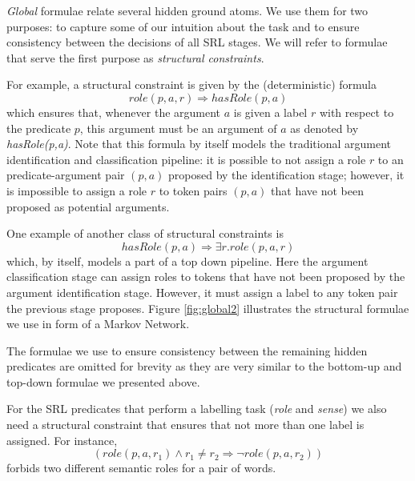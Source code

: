 
\emph{Global} formulae relate several hidden ground atoms. We use them for two purposes: to capture some of our intuition about the task and to ensure consistency between the decisions of all SRL stages. We will refer to formulae that serve the first purpose as \emph{structural constraints}. 

For example, a structural constraint is given by the (deterministic) formula
\[role(p,a,r) \Rightarrow hasRole(p,a)\]
which ensures that, whenever the argument $a$ is given a label $r$ with respect to the predicate $p$, this argument must be an argument of $a$ as denoted by \emph{hasRole(p,a)}. Note that this formula by itself models the traditional argument identification and classification pipeline: it is possible to not assign a role $r$ to an predicate-argument pair $(p,a)$ proposed by the identification stage; however, it is impossible to assign a role $r$ to token pairs $(p,a)$ that have not been proposed as potential arguments.

One example of another class of structural constraints is 
\[
hasRole(p,a)\Rightarrow\exists r.role(p,a,r)
\]
which, by itself, models a part of a top down pipeline. Here the argument classification stage can assign roles to tokens that have not been proposed by the argument identification stage. However, it must assign a label to any token pair the previous stage proposes. 
Figure \ref{fig:global2} illustrates the structural formulae we use in form of a Markov Network.

The formulae we use to ensure consistency between the remaining hidden predicates are omitted for brevity as they are very similar to the bottom-up and top-down formulae we presented above.

For the SRL predicates that perform a labelling task (\emph{role} and \emph{sense}) we also need a structural constraint that ensures that not more than one label is assigned. For instance,
\[
(role(p,a,r_1) \wedge r_1 \neq r_2 \Rightarrow \neg role(p,a,r_2)  )
\]
forbids two different semantic roles for a pair of words. 


